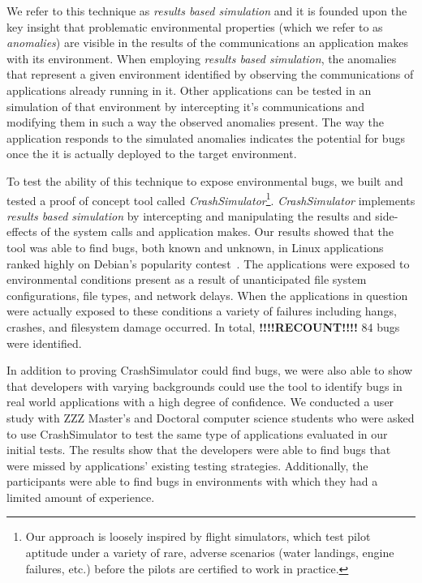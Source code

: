 We refer to this technique as \textit{results based simulation}
and it is founded upon the key insight
that problematic environmental properties
(which we refer to as \textit{anomalies})
are visible in the results of the communications
an application makes with its environment.
When employing \textit{results based simulation},
the anomalies that represent a given environment
identified by
observing the communications of applications already running in it.
Other applications can be tested in an simulation of that environment
by intercepting it's communications
and modifying them in such a way
the observed anomalies present.
The way the application responds to the simulated anomalies
indicates the potential for bugs once the it is actually deployed
to the target environment.

To test the ability of this technique to expose environmental
bugs, we built and tested a proof of concept tool
called {\em CrashSimulator}\footnote{Our approach is
loosely inspired by flight simulators, which test pilot aptitude under a
variety of rare, adverse scenarios (water landings, engine failures, etc.)
before the pilots are certified to work in practice.}.
{\em CrashSimulator} implements \textit{results based simulation}
by intercepting and manipulating the results and side-effects
of the system calls and application makes.
Our results showed that the tool was able to find bugs,
both known and unknown,
in Linux applications ranked highly on Debian's popularity
contest~\cite{DebPopCon}.  The applications were exposed to
environmental conditions present as a result of unanticipated
file system configurations, file types, and network delays.
When the applications in
question were actually exposed to these conditions a variety of failures
including hangs, crashes, and filesystem damage occurred.  In total,
\textbf{!!!!RECOUNT!!!!} 84
bugs were identified.

In addition to proving CrashSimulator could find bugs, we were also able to
show that developers with varying backgrounds
could use the tool to identify bugs
in real world applications
with a high degree of confidence.
We conducted a user study with
ZZZ Master's and Doctoral computer science students
who were asked to use CrashSimulator to test
the same type of applications evaluated in our initial tests.
The results show that the developers were able to find bugs
that were missed by applications' existing testing strategies.
Additionally, the
participants were able to find bugs
in environments with which they had a limited amount of experience.

